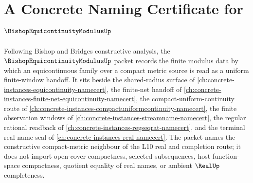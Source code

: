 \chapter{A Concrete Naming Certificate for $\BishopEquicontinuityModulusUp$}
\label{ch:concrete-instances-bishop-equicontinuity-modulus-namecert}

Following Bishop and Bridges constructive analysis, the $\BishopEquicontinuityModulusUp$ packet records the finite modulus data by which an equicontinuous family over a compact metric source is read as a uniform finite-window handoff. It sits beside the shared-radius surface of \autoref{ch:concrete-instances-equicontinuity-namecert}, the finite-net handoff of \autoref{ch:concrete-instances-finite-net-equicontinuity-namecert}, the compact-uniform-continuity route of \autoref{ch:concrete-instances-compactuniformcontinuity-namecert}, the finite observation windows of \autoref{ch:concrete-instances-streamname-namecert}, the regular rational readback of \autoref{ch:concrete-instances-regseqrat-namecert}, and the terminal real-name seal of \autoref{ch:concrete-instances-real-namecert}. The packet names the constructive compact-metric neighbour of the L10 real and completion route; it does not import open-cover compactness, selected subsequences, host function-space compactness, quotient equality of real names, or ambient $\RealUp$ completeness.

